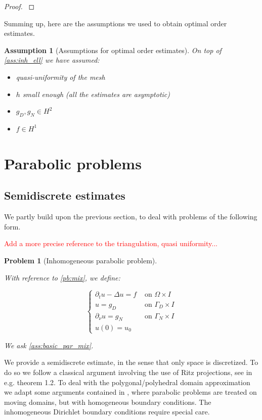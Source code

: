 \documentclass[english,a4paper,9pt,oneside]{scrbook}	%
\theoremstyle{break}
\newtheorem{ass}[equation]{Assumption}
\newtheorem{pb}[equation]{Problem}
\newenvironment{mproof}[1][\proofname]{%
  \begin{proof}[#1]$ $\par\nobreak\ignorespaces
}{%
  \end{proof}
}
\renewcommand*{\proofname}{Proof}
\theoremstyle{remark}
\begin{document}
\begin{appendices}
\begin{mproof}
\end{mproof}

Summing up, here are the assumptions we used to obtain optimal order estimates.

\begin{ass}[Assumptions for optimal order estimates]
On top of \cref{ass:inh_ell} we have assumed:
\begin{itemize}
	\item quasi-uniformity of the mesh
	\item $h$ small enough (all the estimates are asymptotic)
	\item $g_D, g_N \in H^2$
	\item $f \in H^1$
\end{itemize}
\end{ass}

\section{Parabolic problems}

\subsection{Semidiscrete estimates}

We partly build upon the previous section, to deal with problems of the following form.

\textcolor{red}{Add a more precise reference to the triangulation, quasi uniformity...}

\begin{pb}[Inhomogeneous parabolic problem]
\label{pb:inh_parabolic}

With reference to \cref{pb:mix}, we define:

$$
\left\{\begin{matrix}
\partial_t u-\Delta u = f & \text{ on } \Omega \times I \\ 
u = g_D & \text{ on } \Gamma_D \times I\\ 
\partial_\nu u = g_N & \text{ on } \Gamma_N \times I \\
u(0) =  u_0
\end{matrix}\right.
$$

We ask \cref{ass:basic_par_mix}.

\end{pb}

We provide a semidiscrete estimate, in the sense that only space is discretized. To do so we follow a classical argument involving the use of Ritz projections, see \cite{thomee} in e.g. theorem 1.2. To deal with the polygonal/polyhedral domain approximation we adapt some arguments contained in \cite{ranner}, where parabolic problems are treated on moving domains, but with homogeneous boundary conditions. The inhomogeneous Dirichlet boundary conditions require special care.


\end{appendices}
\end{document}
